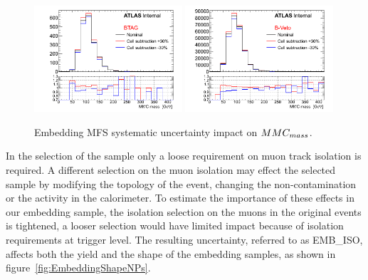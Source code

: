 \begin{figure}[tp]
	\begin{center}
	\includegraphics[width=0.49\textwidth]{figure/systematics/emb_sys_BtagFull_MFS.png}
	\includegraphics[width=0.49\textwidth]{figure/systematics/emb_sys_NoBtagFull_MFS.png}
	\end{center}
	\caption{Embedding MFS systematic uncertainty impact on $MMC_{mass}$.}
	\label{fig:EMBMFS}
\end{figure}

%
%	
%

In the selection of the \Zmumu sample only a loose requirement on muon track isolation is required.
A different selection on the muon isolation may effect the selected sample by modifying the topology of the event, 
changing the non-\Zmumu contamination or the activity in the calorimeter. 
To estimate  the importance of these effects in our
embedding sample, the isolation selection on the muons in the original \Zmumu events is tightened,
a looser selection would have limited impact because of isolation requirements at trigger level.
The resulting uncertainty, referred to as EMB\_ISO, affects both the yield and the \mmc shape of 
the embedding samples, as shown in figure~\ref{fig:EmbeddingShapeNPs}. 

